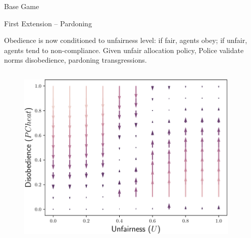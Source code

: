 \documentclass[xcolor={table}]{beamer}
\begin{document}
\begin{frame}[fragile=singleslide,t]
\begin{columns}[T]
\begin{column}{.58\textwidth}
\begin{block}{Base Game}
\end{block} 



\begin{block}{First Extension -- Pardoning}

Obedience is now conditioned to unfairness level: if fair, agents obey; if unfair, agents tend to non-compliance. Given unfair allocation policy, Police validate norms disobedience, pardoning transgressions. 

\begin{columns}[c]
\begin{column}{.6\textwidth}
 
\begin{figure}
  \centering
  \includegraphics[width=1.0\linewidth]{img/phaseext1.pdf}
\end{figure}

\end{column}
\begin{column}{.4\textwidth}




\end{column}
\end{columns}
\end{block}
\end{column}
\end{columns}
\end{frame}
\end{document}
